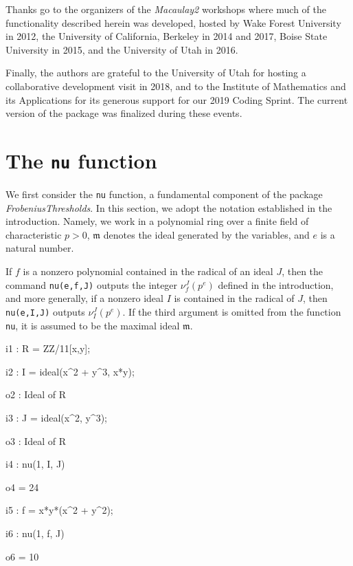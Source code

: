 \documentclass{amsart}
\newcommand{\idealm}{\mathfrak{m}}
\begin{document}
Thanks go to the organizers of the \emph{Macaulay2} workshops where much of the functionality described herein was developed, hosted by Wake Forest University in 2012, the University of California, Berkeley in 2014 and 2017, Boise State University in 2015, and the University of Utah in 2016.

Finally, the authors are grateful to the University of Utah for hosting a collaborative development visit in 2018, and to the Institute of Mathematics and its Applications for its generous support for our 2019 Coding Sprint.
The current version of the package was finalized during these events.

\section{The {\tt nu} function}
\label{sec.Nu}

We first consider the \texttt{nu} function, a fundamental component of the package \emph{FrobeniusThresholds}.
In this section, we adopt the notation established in the introduction.  Namely, we work in a polynomial ring over a finite field of characteristic $p>0$,  $\idealm$ denotes the ideal generated by the variables, and $e$ is a natural number.

If $f$ is a nonzero polynomial contained in the radical of an ideal $J$, then the command \texttt{nu(e,f,J)} outputs the integer $\nu_f^J(p^e)$ defined in the introduction, and
more generally, if a nonzero ideal $I$ is contained in the radical of $J$, then \texttt{nu(e,I,J)} outputs $\nu_I^J(p^e)$.
If the third argument is omitted from the function \texttt{nu}, it is assumed to be the maximal ideal $\idealm$.

\medskip
{\small
{}
\begin{MyVerbatim}
i1 : R = ZZ/11[x,y];

i2 : I = ideal(x^2 + y^3, x*y);

o2 : Ideal of R

i3 : J = ideal(x^2, y^3);

o3 : Ideal of R

i4 : nu(1, I, J)

o4 = 24

i5 : f = x*y*(x^2 + y^2);

i6 : nu(1, f, J)

o6 = 10
\end{MyVerbatim}
}
\medskip
\end{document}
